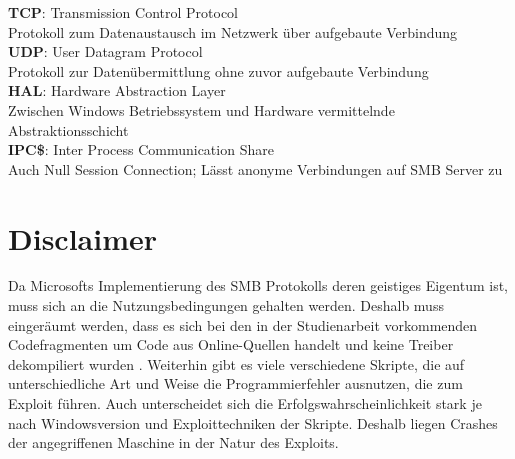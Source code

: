 \documentclass[DIV=12,headings=normal,pdftex,headinclude=false,footinclude=false,final]{scrreprt}
\begin{document}
\noindent
\textbf{TCP}: Transmission Control Protocol\\
Protokoll zum Datenaustausch im Netzwerk über aufgebaute Verbindung\\

\noindent
\textbf{UDP}: User Datagram Protocol\\
Protokoll zur Datenübermittlung ohne zuvor aufgebaute Verbindung\\

\noindent
\textbf{HAL}: Hardware Abstraction Layer\\
Zwischen Windows Betriebssystem und Hardware vermittelnde Abstraktionsschicht\\

\noindent
\textbf{IPC\$}: Inter Process Communication Share\\
Auch Null Session Connection; Lässt anonyme Verbindungen auf SMB Server zu\\

\newpage
{}


\chapter{Disclaimer}
Da Microsofts Implementierung des SMB Protokolls deren geistiges Eigentum ist, muss sich an die Nutzungsbedingungen gehalten werden. Deshalb muss eingeräumt werden, dass es sich bei den in der Studienarbeit vorkommenden Codefragmenten um Code aus Online-Quellen handelt und keine Treiber dekompiliert wurden \cite{MS:LicTerm}. Weiterhin gibt es viele verschiedene Skripte, die auf unterschiedliche Art und Weise die Programmierfehler ausnutzen, die zum Exploit führen. Auch unterscheidet sich die Erfolgswahrscheinlichkeit stark je nach Windowsversion und Exploittechniken der Skripte. Deshalb liegen Crashes der angegriffenen Maschine in der Natur des Exploits.
\end{document}
